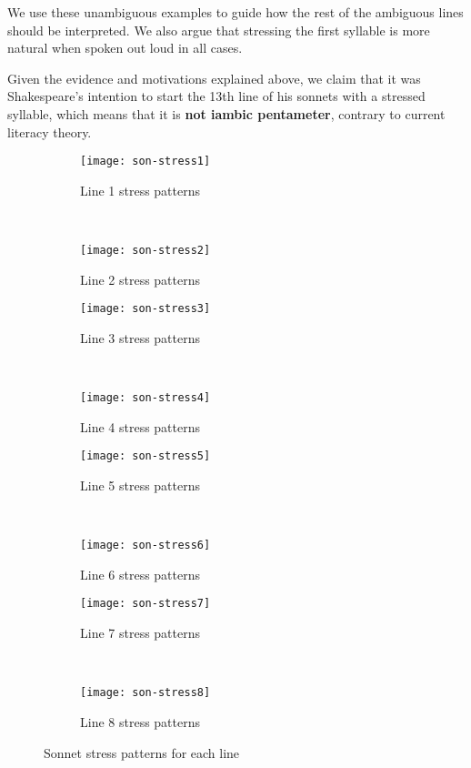\begin{description}
We use these unambiguous examples to guide how the rest of the ambiguous lines should be interpreted. We also argue that stressing the first syllable is more natural when spoken out loud in all cases.

Given the evidence and motivations explained above, we claim that it was Shakespeare's intention to start the 13th line of his sonnets with a stressed syllable, which means that it is \textbf{not iambic pentameter}, contrary to current literacy theory.

\begin{figure}[H]
\centering
\begin{subfigure}[t!]{0.45\textwidth}
	\centering
    \texttt{[image: son-stress1]}
    \caption{Line 1 stress patterns}
    \label{fig:son-stress1}
\end{subfigure}
~
\begin{subfigure}[t!]{0.45\textwidth}
	\centering
    \texttt{[image: son-stress2]}
    \caption{Line 2 stress patterns}
    \label{fig:son-stress2}
\end{subfigure}
\begin{subfigure}[t!]{0.45\textwidth}
	\centering
    \texttt{[image: son-stress3]}
    \caption{Line 3 stress patterns}
    \label{fig:son-stress3}
\end{subfigure}
~
\begin{subfigure}[t!]{0.45\textwidth}
	\centering
    \texttt{[image: son-stress4]}
    \caption{Line 4 stress patterns}
    \label{fig:son-stress4}
\end{subfigure}
\begin{subfigure}[t!]{0.45\textwidth}
	\centering
    \texttt{[image: son-stress5]}
    \caption{Line 5 stress patterns}
    \label{fig:son-stress5}
\end{subfigure}
~
\begin{subfigure}[t!]{0.45\textwidth}
	\centering
    \texttt{[image: son-stress6]}
    \caption{Line 6 stress patterns}
    \label{fig:son-stress6}
\end{subfigure}
\begin{subfigure}[t!]{0.45\textwidth}
	\centering
    \texttt{[image: son-stress7]}
    \caption{Line 7 stress patterns}
    \label{fig:son-stress7}
\end{subfigure}
~
\begin{subfigure}[t!]{0.45\textwidth}
	\centering
    \texttt{[image: son-stress8]}
    \caption{Line 8 stress patterns}
    \label{fig:son-stress8}
\end{subfigure}
\caption{Sonnet stress patterns for each line}
\label{fig:son4}
\end{figure}


\end{description}
